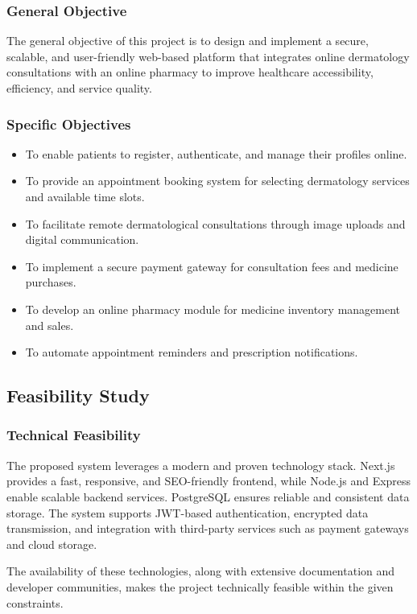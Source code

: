 \documentclass[12pt,a4paper]{report}
\begin{document}
\subsubsection{General Objective}
The general objective of this project is to design and implement a secure, scalable, and user-friendly web-based platform that integrates online dermatology consultations with an online pharmacy to improve healthcare accessibility, efficiency, and service quality.

\subsubsection{Specific Objectives}
\begin{itemize}
    \item To enable patients to register, authenticate, and manage their profiles online.
    \item To provide an appointment booking system for selecting dermatology services and available time slots.
    \item To facilitate remote dermatological consultations through image uploads and digital communication.
    \item To implement a secure payment gateway for consultation fees and medicine purchases.
    \item To develop an online pharmacy module for medicine inventory management and sales.
    \item To automate appointment reminders and prescription notifications.
\end{itemize}



\subsection{Feasibility Study}

\subsubsection{Technical Feasibility}
The proposed system leverages a modern and proven technology stack. Next.js provides a fast, responsive, and SEO-friendly frontend, while Node.js and Express enable scalable backend services. PostgreSQL ensures reliable and consistent data storage. The system supports JWT-based authentication, encrypted data transmission, and integration with third-party services such as payment gateways and cloud storage.

The availability of these technologies, along with extensive documentation and developer communities, makes the project technically feasible within the given constraints.
\end{document}
